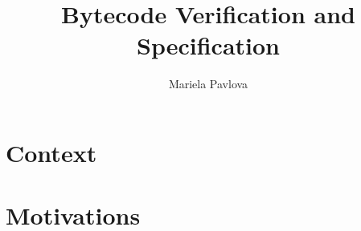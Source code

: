 \documentclass{beamer}
\begin{document}
\title{Bytecode Verification and Specification}
\author{Mariela Pavlova}

\maketitle

\newcommand{\program}{\mbox{\rm\texttt{P}}}%

\newcommand{\subst}[2]{[ #1 \leftarrow #2]}
\newcommand{\requires}{\texttt{requires}}
\newcommand{\ensures}{\texttt{ensures}}
\newcommand{\annotation}{BML}
\newcommand{\exsures}[1]{ \texttt{exsures} (#1)}
\newcommand{\invariant}{ \texttt{invariant}}
\newcommand{\variant}{ \texttt{variant}}
\newcommand{\ghost}{ \texttt{Model}}
\newcommand{\declare}{ \texttt{declare}}
\newcommand{\assert}{ \texttt{assert}}
\newcommand{\modifies}{ \texttt{modifies}}
\newcommand{\ghostSet}{ \texttt{set}}
\newcommand{\expression}{\mathcal{E}}
\newcommand{\predicate}{\mathcal{P}}
%    



\section{Context}


\section{Motivations}


\end{document}
